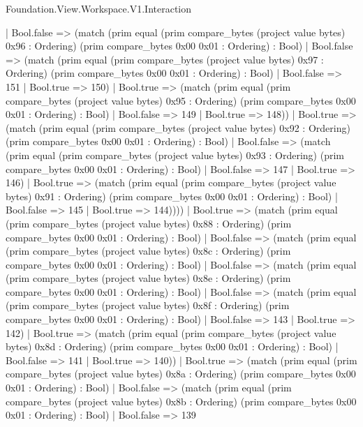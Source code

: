 \begin{lexlean}{Foundation.View.Workspace.V1.Interaction}
\begin{semanticmodule}
{                | Bool.false => (match (prim equal (prim compare_bytes (project value bytes) 0x96 : Ordering) (prim compare_bytes 0x00 0x01 : Ordering) : Bool)
                  | Bool.false => (match (prim equal (prim compare_bytes (project value bytes) 0x97 : Ordering) (prim compare_bytes 0x00 0x01 : Ordering) : Bool)
                    | Bool.false => 151
                    | Bool.true => 150)
                  | Bool.true => (match (prim equal (prim compare_bytes (project value bytes) 0x95 : Ordering) (prim compare_bytes 0x00 0x01 : Ordering) : Bool)
                    | Bool.false => 149
                    | Bool.true => 148))
                | Bool.true => (match (prim equal (prim compare_bytes (project value bytes) 0x92 : Ordering) (prim compare_bytes 0x00 0x01 : Ordering) : Bool)
                  | Bool.false => (match (prim equal (prim compare_bytes (project value bytes) 0x93 : Ordering) (prim compare_bytes 0x00 0x01 : Ordering) : Bool)
                    | Bool.false => 147
                    | Bool.true => 146)
                  | Bool.true => (match (prim equal (prim compare_bytes (project value bytes) 0x91 : Ordering) (prim compare_bytes 0x00 0x01 : Ordering) : Bool)
                    | Bool.false => 145
                    | Bool.true => 144))))
            | Bool.true => (match (prim equal (prim compare_bytes (project value bytes) 0x88 : Ordering) (prim compare_bytes 0x00 0x01 : Ordering) : Bool)
              | Bool.false => (match (prim equal (prim compare_bytes (project value bytes) 0x8c : Ordering) (prim compare_bytes 0x00 0x01 : Ordering) : Bool)
                | Bool.false => (match (prim equal (prim compare_bytes (project value bytes) 0x8e : Ordering) (prim compare_bytes 0x00 0x01 : Ordering) : Bool)
                  | Bool.false => (match (prim equal (prim compare_bytes (project value bytes) 0x8f : Ordering) (prim compare_bytes 0x00 0x01 : Ordering) : Bool)
                    | Bool.false => 143
                    | Bool.true => 142)
                  | Bool.true => (match (prim equal (prim compare_bytes (project value bytes) 0x8d : Ordering) (prim compare_bytes 0x00 0x01 : Ordering) : Bool)
                    | Bool.false => 141
                    | Bool.true => 140))
                | Bool.true => (match (prim equal (prim compare_bytes (project value bytes) 0x8a : Ordering) (prim compare_bytes 0x00 0x01 : Ordering) : Bool)
                  | Bool.false => (match (prim equal (prim compare_bytes (project value bytes) 0x8b : Ordering) (prim compare_bytes 0x00 0x01 : Ordering) : Bool)
                    | Bool.false => 139
}
\end{semanticmodule}
\end{lexlean}
